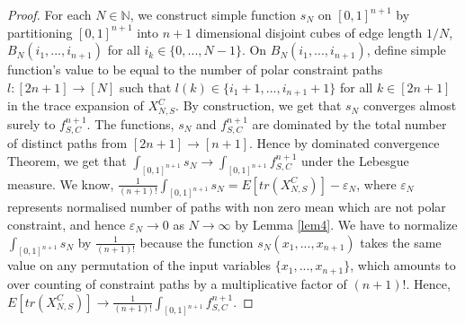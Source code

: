 \documentclass[12pt]{amsart}
\theoremstyle{definition}
\theoremstyle{remark}
\newcommand\red{\color{red}}
\newcommand\blue{\color{blue}}
\begin{document}
\begin{proof}

 For each $N \in \mathbb{N}$, we construct simple function $s_N$ on $[0,1]^{n+1}$ by partitioning $[0,1]^{n+1}$ into $n+1$ dimensional disjoint cubes of edge length $1/N$, $B_N(i_1,...,i_{n+1})$ for all $i_k \in \{0,...,N-1 \}$. On $B_N(i_1,...,i_{n+1})$, define simple function's value to be equal to the number of polar constraint paths $l:[2n+1] \to [N]$ such that $l(k) \in \{i_1+1,...,i_{n+1}+1\}$ for all $k \in [2n+1]$ in the trace expansion of  $X_{N,S}^C$. By construction, we get that $s_N$ converges almost surely to $f_{S,C}^{n+1}$. The functions, $s_N$ and $f_{S,C}^{n+1}$  are dominated by the total number of distinct paths from $[2n+1] \to [n+1]$. Hence by dominated convergence Theorem, we get that $\int_{[0,1]^{n+1}} s_N \to \int_{[0,1]^{n+1}}f_{S,C}^{n+1}$ under the Lebesgue measure. We know, $\frac{1}{(n+1)!}\int_{[0,1]^{n+1}} s_N = E[tr(X_{N,S}^C)] - \varepsilon_N$, where $\varepsilon_N$ represents normalised number of paths with non zero mean which are not polar constraint, and hence $\varepsilon_N \to 0$ as $N \to \infty$ by Lemma \ref{lem4}. We have to normalize $\int_{[0,1]^{n+1}} s_N$ by $\frac{1}{(n+1)!}$ because the function $s_N(x_1,...,x_{n+1})$ takes the same value on any permutation of the input variables $\{x_1,...,x_{n+1}\}$, which amounts to over counting of constraint paths by a multiplicative factor of $(n+1)!$. Hence, $E[tr(X_{N,S}^C)] \to \frac{1}{(n+1)!}\int_{[0,1]^{n+1}}f_{S,C}^{n+1}$. 
\end{proof}
\end{document}
